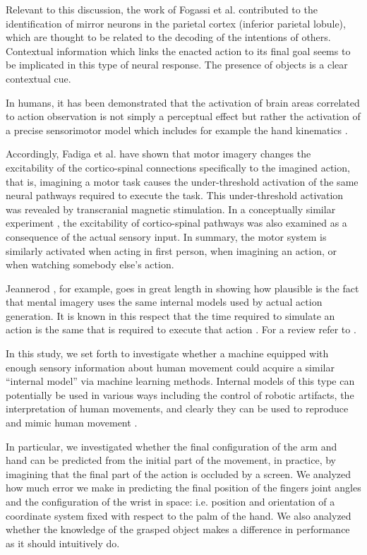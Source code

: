 Relevant to this discussion, the work of Fogassi et al. \cite{fogassi-05} contributed to the 
identification of mirror neurons in the parietal cortex (inferior parietal lobule), which are 
thought to be related to the decoding of the intentions of others. Contextual information 
which links the enacted action to its final goal seems to be implicated in this type of neural 
response. The presence of objects is a clear contextual cue.

In humans, it has been demonstrated that the activation of brain areas correlated to 
action observation is not simply a perceptual effect but rather the activation of
a precise sensorimotor model which includes for example the hand kinematics \cite{pozzo-06}.
 
Accordingly, Fadiga et al. \cite{fadiga-99,vargas-04} have shown that motor imagery changes
the excitability of the cortico-spinal connections specifically to the imagined action, that is, 
imagining a motor task causes the under-threshold activation of the same neural pathways 
required to execute the task. This under-threshold activation was revealed 
by transcranial magnetic stimulation. In a conceptually similar experiment 
\cite{fadiga-05}, the excitability of cortico-spinal pathways was also examined as a consequence 
of the actual sensory input. In summary, the motor system is similarly activated 
when acting in first person, when imagining an action, or when watching somebody else's action.


Jeannerod \cite{jeannerod-88}, for example, goes in great length in showing how plausible is 
the fact that mental imagery uses the same internal models used by actual action generation. 
It is known in this respect that the time required to simulate an action is the same that 
is required to execute that action \cite{sirigu-96}. For a review refer to \cite{jeannerod-99}.

In this study, we set forth to investigate whether a machine equipped with enough sensory 
information about human movement could acquire a similar ``internal model'' via machine 
learning methods. Internal models of this type can potentially be used in various ways
including the control of robotic artifacts, the interpretation of human movements, and 
clearly they can be used to reproduce and mimic human movement \cite{wolpert-01}. 

In particular, we investigated whether the final configuration of the arm and hand can be
predicted from the initial part of the movement, in practice, by imagining that the 
final part of the action is occluded by a screen. We analyzed how much error we make in 
predicting the final position of the fingers joint angles and the configuration of  
the wrist in space: i.e. position and orientation of a coordinate system fixed with respect
to the palm of the hand. We also analyzed whether the knowledge of the grasped object 
makes a difference in performance as it should intuitively do.

